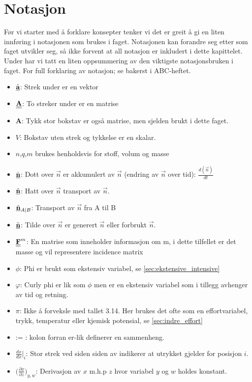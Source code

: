 \clearpage
\section{Notasjon}\label{sec:notasjon}

Før vi starter med å forklare konsepter tenker vi det er greit å gi en liten innføring i notasjonen som brukes i faget. Notasjonen kan forandre seg etter som faget utvikler seg, så ikke forvent at all notasjon er inkludert i dette kapittelet. Under har vi tatt en liten oppsummering av den viktigste notasjonsbruken i faget. For full forklaring av notasjon; se bakerst i ABC-heftet.

\begin{itemize}
    \item $\underline{\hat{\textbf{a}}}$: Strek under er en vektor
    \item $\underline{\underline{\textbf{A}}}$: To streker under er en matrise
    \item $\textbf{A}$: Tykk stor bokstav er også matrise, men sjelden brukt i dette faget.
    \item $V$: Bokstav uten strek og tykkelse er en skalar.
    \item $n$,$q$,$m$ brukes henholdsvis for stoff, volum og masse
    \item $\underline{\dot{\textbf{n}}}$: Dott over $\vec{n}$ er akkumulert av $\vec{n}$ (endring av $\vec{n}$ over tid): $\frac{d(\vec{n})}{dt}$
    \item $\underline{\hat{\textbf{n}}}$: Hatt over $\vec{n}$ transport av $\vec{n}$.
    \item $\underline{\hat{\textbf{n}}}_{A|B}$: Transport av $\vec{n}$ fra A til B
    \item $\underline{\Tilde{\textbf{n}}}$: Tilde over $\vec{n}$ er generert $\vec{n}$ eller forbrukt $\vec{n}$.  
    \item $\underline{\underline{\textbf{F}}}^m$: En matrise som inneholder informasjon om m, i dette tilfellet er det masse og vil representere incidence matrix 
    \item \textbf{$\phi$}: Phi er brukt som ekstensiv variabel, se \cref{sec:ekstensive_intensive}
    \item \textbf{$\varphi$}: Curly phi er lik som $\phi$ men er en ekstensiv variabel som i tillegg avhenger av tid og retning. 
    \item \textbf{$\pi$}: Ikke å forveksle med tallet 3.14. Her brukes det ofte som en effortvariabel, trykk, temperatur eller kjemisk potensial, se \cref{sec:indre_effort} 
    \item := : kolon forran er-lik definerer en sammenheng.
    \item $\frac{dx}{dx}\Big|_i$: Stor strek ved siden siden av indikerer at utrykket gjelder for posisjon $i$.
    \item $\Big(\frac{\partial x}{\partial z}\Big)_{y,w}$: Derivasjon av $x$ m.h.p $z$ hvor variabel $y$ og $w$ holdes konstant.
\end{itemize}

\clearpage